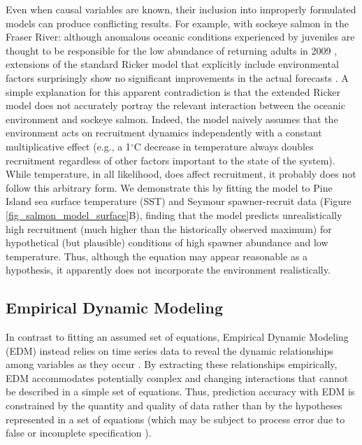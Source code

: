 Even when causal variables are known, their inclusion into improperly formulated models can produce conflicting results. For example, with sockeye salmon in the Fraser River: although anomalous oceanic conditions experienced by juveniles are thought to be responsible for the low abundance of returning adults in 2009 \cite{Peterman_2011, Cohen_2012, Thomson_2012}, extensions of the standard Ricker model that explicitly include environmental factors surprisingly show no significant improvements in the actual forecasts \cite{Grant_2010, MacDonald_2012, Grant_2013}. A simple explanation for this apparent contradiction is that the extended Ricker model does not accurately portray the relevant interaction between the oceanic environment and sockeye salmon. Indeed, the model naively assumes that the environment acts on recruitment dynamics independently with a constant multiplicative effect (e.g., a 1$^\circ$C decrease in temperature always doubles recruitment regardless of other factors important to the state of the system). While temperature, in all likelihood, does affect recruitment, it probably does not follow this arbitrary form. We demonstrate this by fitting the model to Pine Island sea surface temperature (SST) and Seymour spawner-recruit data (Figure \ref{fig_salmon_model_surface}B), finding that the model predicts unrealistically high recruitment (much higher than the historically observed maximum) for hypothetical (but plausible) conditions of high spawner abundance and low temperature. Thus, although the equation may appear reasonable as a hypothesis, it apparently does not  incorporate the environment realistically.

\subsection{Empirical Dynamic Modeling}
In contrast to fitting an assumed set of equations, Empirical Dynamic Modeling (EDM) instead relies on time series data to reveal the dynamic relationships among variables as they occur \cite{Dixon_1999, Sugihara_2012, Sugihara_1990, Liu_2012, Glaser_2014}. By extracting these relationships empirically, EDM accommodates potentially complex and changing interactions that cannot be described in a simple set of equations. Thus, prediction accuracy with EDM is constrained by the quantity and quality of data rather than by the hypotheses represented in a set of equations (which may be subject to process error due to false or incomplete specification \cite{Sugihara_1994}).

